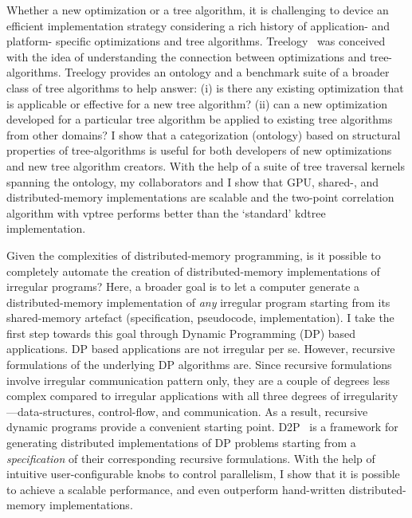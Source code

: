 Whether a new optimization or a tree algorithm, it is challenging to device an efficient implementation strategy considering a rich history of application- and platform- specific optimizations and tree algorithms.
Treelogy~\cite{hegde17ispass} was conceived with the idea of understanding the connection between optimizations and tree-algorithms. 
Treelogy provides an ontology and a benchmark suite of a broader class of tree algorithms to help answer: (i) is there any existing optimization that is applicable or effective for a new tree algorithm?
(ii) can a new optimization developed for a particular tree algorithm be applied to existing tree algorithms from other domains?
I show that a categorization (ontology) based on structural properties of tree-algorithms is useful for both developers of new optimizations and new tree algorithm creators.
With the help of a suite of tree traversal kernels spanning the ontology, my collaborators and I show that GPU, shared-, and distributed-memory implementations are scalable and the two-point correlation algorithm with vptree performs better than the `standard' kdtree implementation.

Given the complexities of distributed-memory programming, is it possible to completely automate the creation of distributed-memory implementations of irregular programs? 
Here, a broader goal is to let a computer generate a distributed-memory implementation of {\em any} irregular program starting from its shared-memory artefact (specification, pseudocode, implementation). 
I take the first step towards this goal through Dynamic Programming (DP) based applications. 
DP based applications are not irregular per se. 
However, recursive formulations of the underlying DP algorithms are. 
Since recursive formulations involve irregular communication pattern only, they are a couple of degrees less complex compared to irregular applications with all three degrees of irregularity---data-structures, control-flow, and communication. As a result, recursive dynamic programs provide a convenient starting point. 
D2P~\cite{hegde19d2p} is a framework for generating distributed implementations of DP problems starting from a {\em specification} of their corresponding recursive formulations.
With the help of intuitive user-configurable knobs to control parallelism, I show that it is possible to achieve a scalable performance, and even outperform hand-written distributed-memory implementations.

